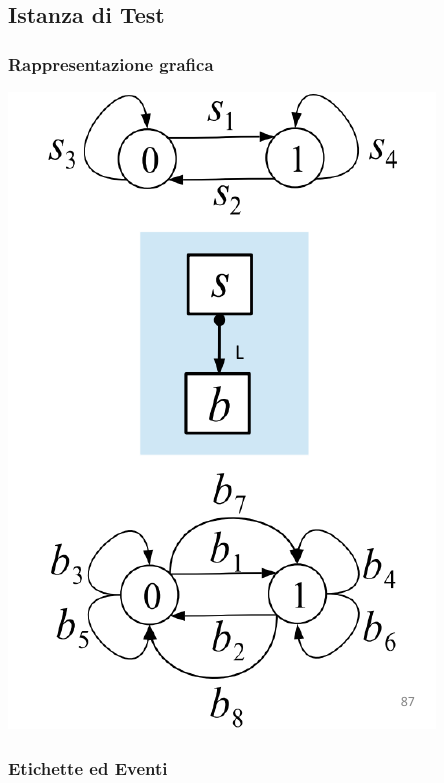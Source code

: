\subsection{Istanza di Test}
\subsubsection{Rappresentazione grafica}
\includegraphics[width=\textwidth]{immagini/t1.png}

\subsubsection{Etichette ed Eventi}

